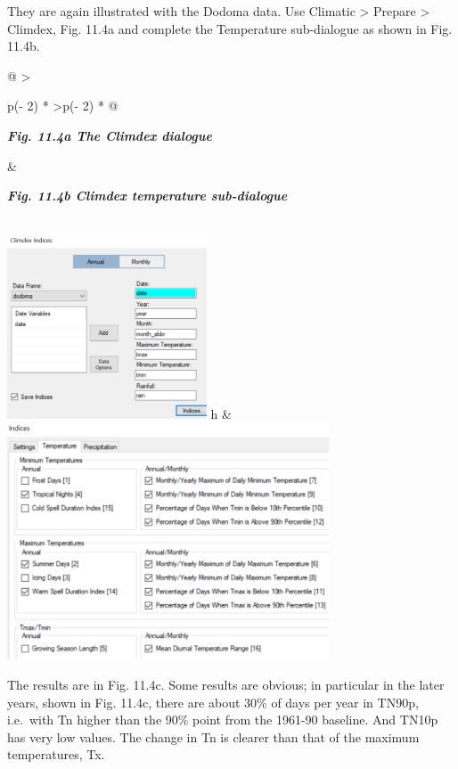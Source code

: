 \documentclass[
  letterpaper,
  DIV=11,
  numbers=noendperiod]{scrreprt}
\begin{document}
They are again illustrated with the Dodoma data. Use Climatic
\textgreater{} Prepare \textgreater{} Climdex, Fig. 11.4a and complete
the Temperature sub-dialogue as shown in Fig. 11.4b.

\begin{longtable}[]{@{}
  >{\raggedright\arraybackslash}p{(\columnwidth - 2\tabcolsep) * }
  >{\raggedleft\arraybackslash}p{(\columnwidth - 2\tabcolsep) * }@{}}
\toprule\noalign{}
\begin{minipage}[b]{\linewidth}\raggedright
\textbf{\emph{Fig. 11.4a The Climdex dialogue}}
\end{minipage} & \begin{minipage}[b]{\linewidth}\raggedleft
\textbf{\emph{Fig. 11.4b Climdex temperature sub-dialogue}}
\end{minipage} \\
\midrule\noalign{}
\endhead
\bottomrule\noalign{}
\endlastfoot
\includegraphics[width=2.33139in,height=2.15236in]{figures/Fig11.4a.png}
h &
\includegraphics[width=3.75901in,height=\textheight]{figures/Fig11.4b.png} \\
\end{longtable}

The results are in Fig. 11.4c. Some results are obvious; in particular
in the later years, shown in Fig. 11.4c, there are about 30\% of days
per year in TN90p, i.e.~with Tn higher than the 90\% point from the
1961-90 baseline. And TN10p has very low values. The change in Tn is
clearer than that of the maximum temperatures, Tx.
\end{document}
